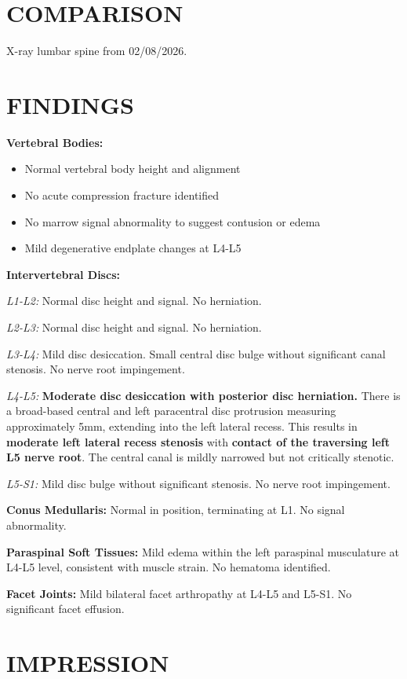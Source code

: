 \documentclass[11pt]{article}
\begin{document}
\section*{COMPARISON}

X-ray lumbar spine from 02/08/2026.

\section*{FINDINGS}

\textbf{Vertebral Bodies:}
\begin{itemize}[nosep]
\item Normal vertebral body height and alignment
\item No acute compression fracture identified
\item No marrow signal abnormality to suggest contusion or edema
\item Mild degenerative endplate changes at L4-L5
\end{itemize}

\textbf{Intervertebral Discs:}

\textit{L1-L2:} Normal disc height and signal. No herniation.

\textit{L2-L3:} Normal disc height and signal. No herniation.

\textit{L3-L4:} Mild disc desiccation. Small central disc bulge without significant canal stenosis. No nerve root impingement.

\textit{L4-L5:} \textbf{Moderate disc desiccation with posterior disc herniation.} There is a broad-based central and left paracentral disc protrusion measuring approximately 5mm, extending into the left lateral recess. This results in \textbf{moderate left lateral recess stenosis} with \textbf{contact of the traversing left L5 nerve root}. The central canal is mildly narrowed but not critically stenotic.

\textit{L5-S1:} Mild disc bulge without significant stenosis. No nerve root impingement.

\textbf{Conus Medullaris:} Normal in position, terminating at L1. No signal abnormality.

\textbf{Paraspinal Soft Tissues:} Mild edema within the left paraspinal musculature at L4-L5 level, consistent with muscle strain. No hematoma identified.

\textbf{Facet Joints:} Mild bilateral facet arthropathy at L4-L5 and L5-S1. No significant facet effusion.

\section*{IMPRESSION}
\end{document}
